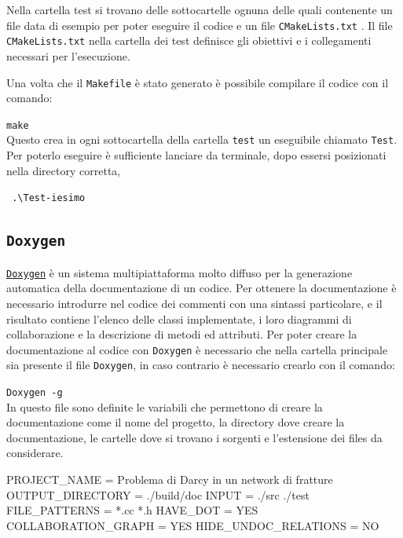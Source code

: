 \par \noindent Nella cartella test si trovano delle sottocartelle ognuna delle quali contenente un file data di esempio per poter eseguire il codice e un file  \texttt{CMakeLists.txt} . Il file  \texttt{CMakeLists.txt} nella cartella dei test definisce gli obiettivi e i collegamenti necessari per l'esecuzione. 

\par Una volta che il \texttt{Makefile} è stato generato è possibile compilare il codice con il comando: \\ 
\par \texttt{make}\\

\noindent Questo crea in ogni sottocartella della cartella \texttt{test} un eseguibile chiamato \texttt{Test}. Per poterlo eseguire è sufficiente lanciare da terminale, dopo essersi posizionati nella directory corretta, 
\par \texttt{ .\textbackslash Test-iesimo }

\subsection{\texttt{Doxygen}}
\href{www.doxygen.org/}{\texttt{Doxygen}} è un sistema multipiattaforma molto diffuso per la generazione automatica della documentazione di un codice. Per ottenere la documentazione è necessario introdurre nel codice dei commenti con una sintassi particolare, e il risultato contiene l’elenco delle classi implementate, i loro diagrammi di collaborazione e la descrizione di metodi ed attributi.
Per poter creare la documentazione al codice con \texttt{Doxygen} è necessario che nella cartella principale sia presente il file \texttt{Doxygen}, in caso contrario è necessario crearlo con il comando:\\
\par \texttt{Doxygen -g}\\

\noindent In questo file sono definite le variabili che permettono di creare la documentazione come il nome del progetto, la directory dove creare la documentazione, le cartelle dove si trovano i sorgenti e l'estensione dei files da considerare.

\begin{Code03_01}
PROJECT_NAME 				=	 Problema di Darcy in un network di fratture
OUTPUT_DIRECTORY			=	./build/doc
INPUT						= 	./src ./test
FILE_PATTERNS				= 	*.cc *.h
HAVE_DOT					=	YES
COLLABORATION_GRAPH		=	YES
HIDE_UNDOC_RELATIONS		=	NO
\end{Code03_01}

